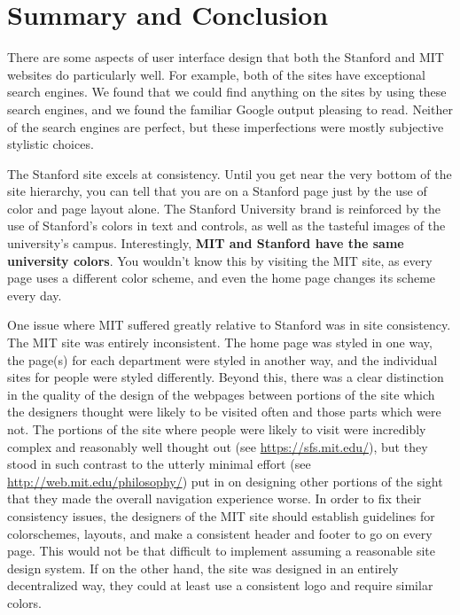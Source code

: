 \section*{Summary and Conclusion}

There are some aspects of user interface design that both the Stanford and MIT
websites do particularly well. For example, both of the sites have exceptional
search engines. We found that we could find anything on the sites by using
these search engines, and we found the familiar Google output pleasing to
read. Neither of the search engines are perfect, but these imperfections were
mostly subjective stylistic choices.

The Stanford site excels at consistency. Until you get near the very bottom of the
site hierarchy, you can tell that you are on a Stanford page just by the use of
color and page layout alone. The Stanford University brand is reinforced by the
use of Stanford's colors in text and controls, as well as the tasteful images
of the university's campus. Interestingly, \textbf{MIT and Stanford have the
same university colors}. You wouldn't know this by visiting the MIT site, as
every page uses a different color scheme, and even the home page changes its
scheme every day.

One issue where MIT suffered greatly relative to Stanford was in site consistency. The MIT site was entirely inconsistent. The
home page was styled in one way, the page(s) for each department were styled in another way, and the individual sites for people
were styled differently. Beyond this, there was a clear distinction in the quality of the design of the webpages between portions
of the site which the designers thought were likely to be visited often and those parts which were not. The portions of the site
where people were likely to visit were incredibly complex and reasonably well thought out (see \url{https://sfs.mit.edu/}),
but they stood in such contrast to the utterly minimal effort (see \url{http://web.mit.edu/philosophy/}) put in on designing other portions of the sight that they made the overall navigation experience worse. In order to fix their consistency
issues, the designers of the MIT site should establish guidelines for colorschemes, layouts, and make a consistent header and
footer to go on every page. This would not be that difficult to implement assuming a reasonable site design system. If on the other
hand, the site was designed in an entirely decentralized way, they could at least use a consistent logo and require similar colors.

